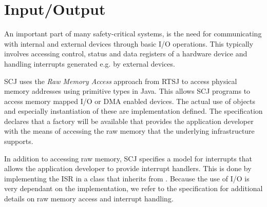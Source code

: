 \section{Input/Output}
\label{section:inputOutput}
An important part of many safety-critical systems, is the need for communicating with internal and external devices through basic I/O operations. This typically involves accessing control, status and data registers of a hardware device and handling interrupts generated e.g. by external devices.

SCJ uses the \textit{Raw Memory Access} approach from RTSJ to access physical memory addresses using primitive types in Java. This allows SCJ programs to access memory mapped I/O or DMA enabled devices. The actual use of  objects and especially instantiation of these are implementation defined. The specification declares that a factory will be available that provides the application developer with the means of accessing the raw memory that the underlying infrastructure supports.

In addition to accessing raw memory, SCJ specifies a model for interrupts that allows the application developer to provide interrupt handlers. This is done by implementing the ISR in a class that inherits from . Because the use of I/O is very dependant on the implementation, we refer to the specification for additional details on raw memory access and interrupt handling.